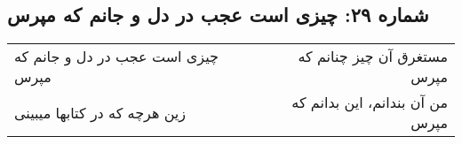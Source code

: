 \begin{center}
\section*{شماره ۲۹: چیزی است عجب در دل و جانم که مپرس}
\label{sec:029}
\begin{longtable}{l p{0.5cm} r}
چیزی است عجب در دل و جانم که مپرس
&&
مستغرق آن چیز چنانم که مپرس
\\
زین هرچه که در کتابها میبینی
&&
من آن بندانم، این بدانم که مپرس
\\
\end{longtable}
\end{center}
